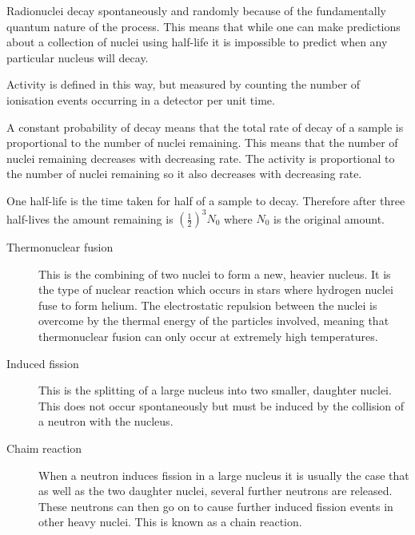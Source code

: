 \documentclass[main.tex]{subfiles}
\begin{document}

Radionuclei decay spontaneously and randomly because of the fundamentally quantum nature of the process. This means that while one can make predictions about a collection of nuclei using half-life it is impossible to predict when any particular nucleus will decay.


Activity is defined in this way, but measured by counting the number of ionisation events occurring in a detector per unit time.


A constant probability of decay means that the total rate of decay of a sample is proportional to the number of nuclei remaining. This means that the number of nuclei remaining decreases with decreasing rate. The activity is proportional to the number of nuclei remaining so it also decreases with decreasing rate.


One half-life is the time taken for half of a sample to decay. Therefore after three half-lives the amount remaining is $\left(\frac{1}{2}\right)^3 N_0$ where $N_0$ is the original amount.


\begin{description}
  \item[Thermonuclear fusion] This is the combining of two nuclei to form a new, heavier nucleus. It is the type of nuclear reaction which occurs in stars where hydrogen nuclei fuse to form helium. The electrostatic repulsion between the nuclei is overcome by the thermal energy of the particles involved,  meaning that thermonuclear fusion can only occur at extremely high temperatures.
  \item[Induced fission] This is the splitting of a large nucleus into two smaller, daughter nuclei. This does not occur spontaneously but must be induced by the collision of a neutron with the nucleus.
  \newpage
  \item[Chaim reaction] When a neutron induces fission in a large nucleus it is usually the case that as well as the two daughter nuclei, several further neutrons are released. These neutrons can then go on to cause further induced fission events in other heavy nuclei. This is known as a chain reaction.
\end{description}
\end{document}
